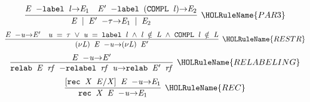 \documentclass[GCNS]{yincog}
\renewcommand{\HOLinline}[1]{\mbox{\textup{\texttt{#1}}}}
\renewcommand{\HOLConst}[1]{\texttt{#1}}
\renewcommand{\HOLFreeVar}[1]{\ensuremath{\mathit{#1}}}
\renewcommand{\HOLSymConst}[1]{#1}
\renewcommand{\HOLTokenConj}{\ensuremath{\wedge}}
\renewcommand{\HOLTokenNotIn}{\ensuremath{\notin}}
\renewcommand{\HOLTokenDisj}{\ensuremath{\vee}}
\theoremstyle{remark}
\theoremstyle{theorem}
\theoremstyle{remark}
\newcommand{\HOLTokenTransBegin}{$-$}
\newcommand{\HOLTokenTransEnd}{$\rightarrow$\xspace}
\begin{document}
\begin{itemize}
\begin{alltt}
\end{alltt}
%
\begin{equation*}
\infer[\HOLRuleName{PAR3}]{\HOLinline{\HOLFreeVar{E} \HOLSymConst{\ensuremath{\mid}} \ensuremath{\HOLFreeVar{E}\sp{\prime}} \HOLTokenTransBegin \HOLSymConst{\ensuremath{\tau}}\HOLTokenTransEnd \ensuremath{\HOLFreeVar{E}\sb{\mathrm{1}}} \HOLSymConst{\ensuremath{\mid}} \ensuremath{\HOLFreeVar{E}\sb{\mathrm{2}}}}}{\HOLinline{\HOLFreeVar{E} \HOLTokenTransBegin \HOLConst{label} \HOLFreeVar{l}\HOLTokenTransEnd \ensuremath{\HOLFreeVar{E}\sb{\mathrm{1}}}}&\HOLinline{\ensuremath{\HOLFreeVar{E}\sp{\prime}} \HOLTokenTransBegin \HOLConst{label} \ensuremath{(}\HOLConst{COMPL} \HOLFreeVar{l}\ensuremath{)}\HOLTokenTransEnd \ensuremath{\HOLFreeVar{E}\sb{\mathrm{2}}}}}
\end{equation*}
%
\begin{equation*}
\infer[\HOLRuleName{RESTR}]{\HOLinline{\ensuremath{(\nu}\HOLFreeVar{L}\ensuremath{)} \HOLFreeVar{E} \HOLTokenTransBegin \HOLFreeVar{u}\HOLTokenTransEnd \ensuremath{(\nu}\HOLFreeVar{L}\ensuremath{)} \ensuremath{\HOLFreeVar{E}\sp{\prime}}}}{\HOLinline{\HOLFreeVar{E} \HOLTokenTransBegin \HOLFreeVar{u}\HOLTokenTransEnd \ensuremath{\HOLFreeVar{E}\sp{\prime}}}&\HOLinline{\HOLFreeVar{u} \HOLSymConst{\ensuremath{=}} \HOLSymConst{\ensuremath{\tau}} \HOLSymConst{\HOLTokenDisj{}} \HOLFreeVar{u} \HOLSymConst{\ensuremath{=}} \HOLConst{label} \HOLFreeVar{l} \HOLSymConst{\HOLTokenConj{}} \HOLFreeVar{l} \HOLSymConst{\HOLTokenNotIn{}} \HOLFreeVar{L} \HOLSymConst{\HOLTokenConj{}} \HOLConst{COMPL} \HOLFreeVar{l} \HOLSymConst{\HOLTokenNotIn{}} \HOLFreeVar{L}}}
\end{equation*}
%
\begin{equation*}
\infer[\HOLRuleName{RELABELING}]{\HOLinline{\HOLConst{relab} \HOLFreeVar{E} \HOLFreeVar{rf} \HOLTokenTransBegin \HOLConst{relabel} \HOLFreeVar{rf} \HOLFreeVar{u}\HOLTokenTransEnd \HOLConst{relab} \ensuremath{\HOLFreeVar{E}\sp{\prime}} \HOLFreeVar{rf}}}{\HOLinline{\HOLFreeVar{E} \HOLTokenTransBegin \HOLFreeVar{u}\HOLTokenTransEnd \ensuremath{\HOLFreeVar{E}\sp{\prime}}}}
\end{equation*}
%
\begin{equation*}
\infer[\HOLRuleName{REC}]{\HOLinline{\HOLConst{rec} \HOLFreeVar{X} \HOLFreeVar{E} \HOLTokenTransBegin \HOLFreeVar{u}\HOLTokenTransEnd \ensuremath{\HOLFreeVar{E}\sb{\mathrm{1}}}}}{\HOLinline{\ensuremath{[}\HOLConst{rec} \HOLFreeVar{X} \HOLFreeVar{E}\ensuremath{/}\HOLFreeVar{X}\ensuremath{]} \HOLFreeVar{E} \HOLTokenTransBegin \HOLFreeVar{u}\HOLTokenTransEnd \ensuremath{\HOLFreeVar{E}\sb{\mathrm{1}}}}}

\end{equation*}
\end{itemize}
\end{document}
